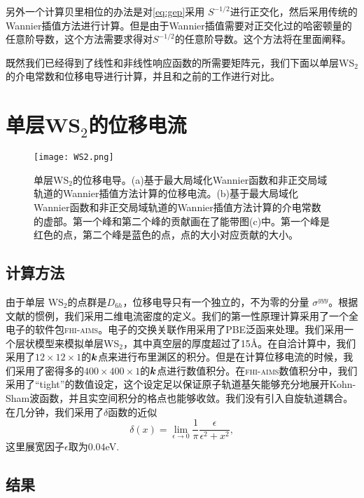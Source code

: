 另外一个计算贝里相位的办法是对\ref{eq:gep}采用 $S^{-1/2}$进行正交化，然后采用传统的Wannier插值方法进行计算。但是由于Wannier插值需要对正交化过的哈密顿量的任意阶导数，这个方法需要求得对$S^{-1/2}$的任意阶导数。这个方法将在里面阐释。

既然我们已经得到了线性和非线性响应函数的所需要矩阵元，我们下面以单层WS$_2$的介电常数和位移电导进行计算，并且和之前的工作进行对比。

\section{单层WS$_2$的位移电流}

\begin{figure}
    \texttt{[image: WS2.png]}
    \centering
    \caption{单层WS$_2$的位移电导。(a)基于最大局域化Wannier函数和非正交局域轨道的Wannier插值方法计算的位移电流。(b)基于最大局域化Wannier函数和非正交局域轨道的Wannier插值方法计算的介电常数的虚部。第一个峰和第二个峰的贡献画在了能带图(c)中。第一个峰是红色的点，第二个峰是蓝色的点，点的大小对应贡献的大小。\label{fig:WS2}}
\end{figure}

\subsection{计算方法}

由于单层 WS$_2$的点群是$D_{6h}$，位移电导只有一个独立的，不为零的分量 $\sigma^{yyy}$\cite{bilbao,wang_first-principles_2017}。根据文献的惯例，我们采用二维电流密度的定义。我们的第一性原理计算采用了一个全电子的软件包\textsc{fhi-aims}。电子的交换关联作用采用了PBE泛函\cite{perdew_generalized_1996}来处理。我们采用一个层状模型来模拟单层WS$_2$，其中真空层的厚度超过了15\AA。在自洽计算中，我们采用了$12\times12\times1$的$\boldsymbol{k}$点来进行布里渊区的积分。但是在计算位移电流的时候，我们采用了密得多的$400\times400\times1$的$\boldsymbol{k}$点进行数值积分。在\textsc{fhi-aims}数值积分中，我们采用了“tight”的数值设定，这个设定足以保证原子轨道基矢能够充分地展开Kohn-Sham波函数，并且实空间积分的格点也能够收敛\cite{blum_ab_2009}。我们没有引入自旋轨道耦合。在几分钟，我们采用了$\delta$函数的近似
\[
\delta(x)=\lim_{\epsilon\to0}\frac{1}{\pi}\frac{\epsilon}{\epsilon^2+x^2},
\]
这里展宽因子$\epsilon$取为$0.04$eV.


\subsection{结果}

